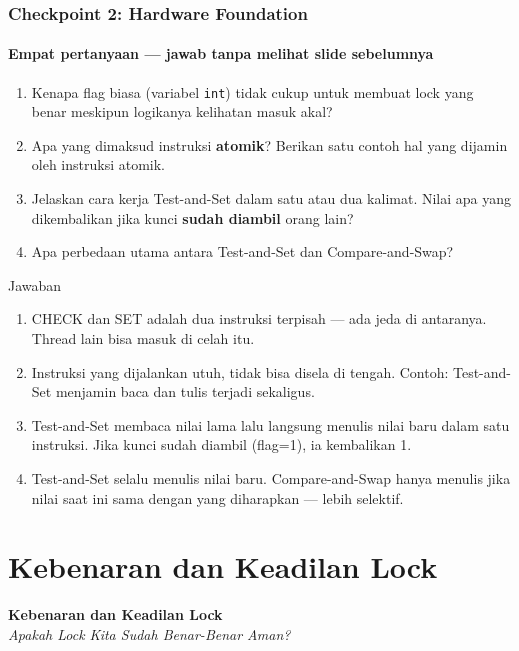 \documentclass[t,aspectratio=169,xcolor=dvipsnames]{beamer}
\begin{document}
\begin{frame}[shrink=15]
    \frametitle{Checkpoint 2: Hardware Foundation}
    \framesubtitle{Empat pertanyaan — jawab tanpa melihat slide sebelumnya}
    \small

    \begin{enumerate}
        \item Kenapa flag biasa (variabel \texttt{int}) tidak cukup untuk membuat lock yang benar meskipun logikanya kelihatan masuk akal?
        \item Apa yang dimaksud instruksi \textbf{atomik}? Berikan satu contoh hal yang dijamin oleh instruksi atomik.
        \item Jelaskan cara kerja Test-and-Set dalam satu atau dua kalimat. Nilai apa yang dikembalikan jika kunci \textbf{sudah diambil} orang lain?
        \item Apa perbedaan utama antara Test-and-Set dan Compare-and-Swap?
    \end{enumerate}

    \begin{block}{Jawaban}
        \footnotesize
        \begin{enumerate}
            \item CHECK dan SET adalah dua instruksi terpisah — ada jeda di antaranya. Thread lain bisa masuk di celah itu.
            \item Instruksi yang dijalankan utuh, tidak bisa disela di tengah. Contoh: Test-and-Set menjamin baca dan tulis terjadi sekaligus.
            \item Test-and-Set membaca nilai lama lalu langsung menulis nilai baru dalam satu instruksi. Jika kunci sudah diambil (flag=1), ia kembalikan 1.
            \item Test-and-Set selalu menulis nilai baru. Compare-and-Swap hanya menulis jika nilai saat ini sama dengan yang diharapkan — lebih selektif.
        \end{enumerate}
    \end{block}
\end{frame}

\section{Kebenaran dan Keadilan Lock}

\begin{frame}[plain]
    \begin{center}
        \vspace{3cm}
        \Huge\textbf{Kebenaran dan Keadilan Lock}\\[0.4em]
        \Large\textit{Apakah Lock Kita Sudah Benar-Benar Aman?}
    \end{center}
\end{frame}
\end{document}
